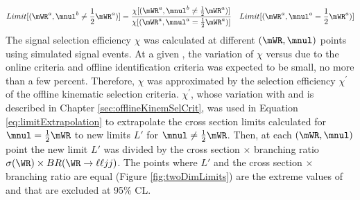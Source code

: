 \begin{equation}
	Limit[(\mWR^{a}, \mnul^{b} \neq \frac{1}{2}\mWR^{a})] = \frac{\chi[(\mWR^{a}, \mnul^{b} \neq \frac{1}{2}\mWR^{a})]}{\chi[(\mWR^{a}, \mnul^{a} = \frac{1}{2}\mWR^{a})]} \quad Limit[(\mWR^{a}, \mnul^{a} = \frac{1}{2}\mWR^{a})]
\label{eq:limitExtrapolation}
\end{equation}
The signal selection efficiency $\chi$ was calculated at different $(\mWR,\mnul)$ points using simulated signal events.  At a given 
\mWR, the variation of $\chi$ versus \mnul due to the online criteria and offline identification criteria was expected to be small, no 
more than a few percent.  Therefore, $\chi$ was approximated by the selection efficiency $\chi^'$ of the offline kinematic selection 
criteria.  $\chi^'$, whose variation with \mWR and \mnul is described in Chapter \ref{sec:offlineKinemSelCrit}, was used in Equation 
\ref{eq:limitExtrapolation} to extrapolate the cross section limits calculated for $\mnul = \frac{1}{2}\mWR$ to new limits $L'$ for 
$\mnul \neq \frac{1}{2}\mWR$.  Then, at each $(\mWR,\mnul)$ point the new limit $L'$ was divided by the cross section $\times$ branching 
ratio $\sigma(\WR) \times BR(\WR \rightarrow \ell\ell jj)$.  The points where $L'$ and the cross section $\times$ branching ratio are 
equal (Figure \ref{fig:twoDimLimits}) are the extreme values of \mnul and \mWR that are excluded at 95\% CL.

